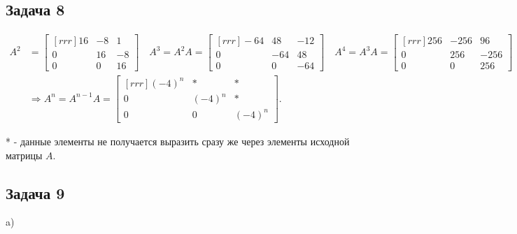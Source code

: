 \documentclass[a4paper,11pt]{article}
\begin{document}
\subsection{Задача 8}

\begin{align*}
A^2 & =
\begin{bmatrix}[rrr]
  16 &  -8 &   1 \\
   0 &  16 &  -8 \\
   0 &   0 &  16
\end{bmatrix}
\quad
A^3 = A^2 A =
\begin{bmatrix}[rrr]
 -64 &  48 & -12 \\
   0 & -64 &  48 \\
   0 &   0 & -64
\end{bmatrix}
\quad
A^4 = A^3 A =
\begin{bmatrix}[rrr]
 256 &-256 &  96 \\
   0 & 256 &-256 \\
   0 &   0 & 256
\end{bmatrix}
\\
& \Rightarrow
A^n = A^{n-1}A =
\begin{bmatrix}[rrr]
  (-4)^n &      * & * \\
       0 & (-4)^n & * \\
       0 &      0 & (-4)^n
\end{bmatrix}.
\end{align*}

* - данные элементы не получается выразить сразу же через элементы исходной матрицы $A$.

\subsection{Задача 9}

a) 
\end{document}
